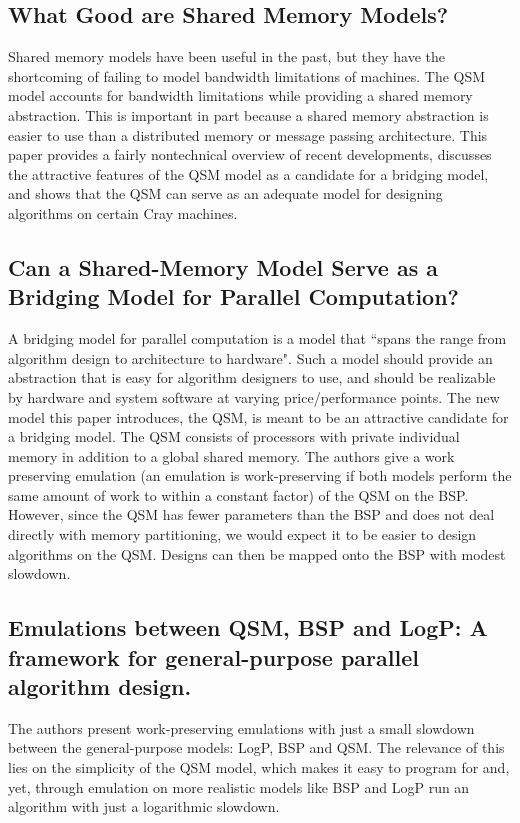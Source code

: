 \documentclass[12pt,a4paper]{article}
\begin{document}
\subsection{What Good are Shared Memory Models? \cite{Gib96}}
Shared memory models have been useful in the past, but they have the shortcoming of failing to model bandwidth limitations of machines. The QSM model
accounts for bandwidth limitations while providing a shared memory abstraction. This is important in part because a shared memory abstraction is easier
to use than a distributed memory or message passing architecture.
This paper provides a fairly nontechnical overview of recent developments, discusses the attractive features of the QSM model as a candidate for a
bridging model, and shows that the QSM can serve as an adequate model for designing algorithms on certain Cray machines.

\subsection{Can a Shared-Memory Model Serve as a Bridging Model for Parallel Computation? \cite{Gib99}}
A bridging model for parallel computation is a model that ``spans the range from algorithm design to architecture to hardware". \cite{Gib99}
Such a model should provide an abstraction that is easy for algorithm designers to use, and should be realizable by hardware and system software at varying
price/performance points.
The new model this paper introduces, the QSM, is meant to be an attractive candidate for a bridging model. The QSM consists of processors with private
individual memory in addition to a global shared memory.
The authors give a work preserving emulation (an emulation is work-preserving if both models perform the same amount of work to within a constant factor) of
the QSM on the BSP. However, since the QSM has fewer parameters than the BSP and does not deal directly with memory partitioning, we would expect it to be
easier to design algorithms on the QSM. Designs can then be mapped onto the BSP with modest slowdown. 

\subsection{Emulations between QSM, BSP and LogP: A framework for general-purpose parallel algorithm design. \cite{Vlr03}}
The authors present work-preserving emulations with just a small slowdown between the general-purpose models: LogP, BSP and QSM. The relevance of this lies 
on the simplicity of the QSM model, which makes it easy to program for and, yet, through emulation on more realistic models like BSP and LogP run an 
algorithm with just a logarithmic slowdown.
\end{document}

